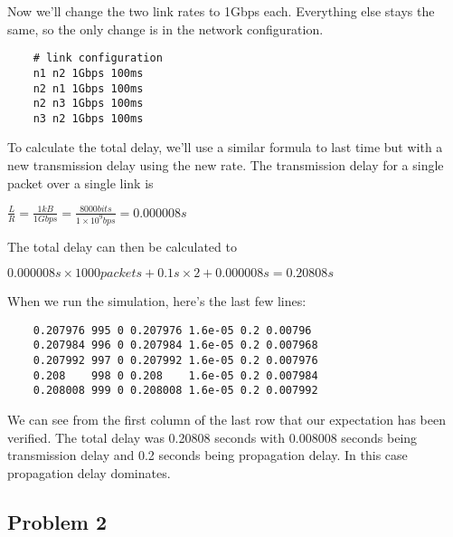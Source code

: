 \documentclass[11pt]{article}
\begin{document}
Now we'll change the two link rates to 1Gbps each. Everything else stays the same, so the only change is in the network configuration.

\vspace{5mm}

\begin{lstlisting}
    # link configuration
    n1 n2 1Gbps 100ms
    n2 n1 1Gbps 100ms
    n2 n3 1Gbps 100ms
    n3 n2 1Gbps 100ms
\end{lstlisting}

\vspace{5mm}

To calculate the total delay, we'll use a similar formula to last time but with a new transmission delay using the new rate. The transmission delay for a single packet over a single link is

\vspace{5mm}

\(\frac{L}{R} = \frac{1kB}{1Gbps} = \frac{8000bits}{1\times10^9 bps} = 0.000008s\)

\vspace{5mm}

The total delay can then be calculated to 

\vspace{5mm}

\(0.000008s\times1000packets + 0.1s\times2 + 0.000008s = 0.20808s\)

\vspace{5mm}

When we run the simulation, here's the last few lines:

\vspace{5mm}

\begin{lstlisting}
    0.207976 995 0 0.207976 1.6e-05 0.2 0.00796
    0.207984 996 0 0.207984 1.6e-05 0.2 0.007968
    0.207992 997 0 0.207992 1.6e-05 0.2 0.007976
    0.208    998 0 0.208    1.6e-05 0.2 0.007984
    0.208008 999 0 0.208008 1.6e-05 0.2 0.007992
\end{lstlisting}

\vspace{5mm}

We can see from the first column of the last row that our expectation has been verified. The total delay was 0.20808 seconds with 0.008008 seconds being transmission delay and 0.2 seconds being propagation delay. In this case propagation delay dominates.

\subsection{Problem 2}
\end{document}
